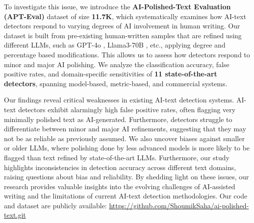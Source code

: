To investigate this issue, we introduce the \textbf{AI-Polished-Text Evaluation (APT-Eval)} dataset of size \textbf{11.7K}, which systematically examines how AI-text detectors respond to varying degrees of AI involvement in human writing. Our dataset is built from pre-existing human-written samples that are refined using different LLMs, such as GPT-4o \citep{openaiGPT4}, Llama3-70B \citep{dubey2024llama}, etc., applying degree and percentage based modifications. This allows us to assess how detectors respond to minor and major AI polishing. We analyze the classification accuracy, false positive rates, and domain-specific sensitivities of \textbf{11 state-of-the-art detectors}, spanning model-based, metric-based, and commercial systems.


Our findings reveal critical weaknesses in existing AI-text detection systems. AI-text detectors exhibit alarmingly high false positive rates, often flagging very minimally polished text as AI-generated. Furthermore, detectors struggle to differentiate between minor and major AI refinements, suggesting that they may not be as reliable as previously assumed. We also uncover biases against smaller or older LLMs, where polishing done by less advanced models is more likely to be flagged than text refined by state-of-the-art LLMs. Furthermore, our study highlights inconsistencies in detection accuracy across different text domains, raising questions about bias and reliability. By shedding light on these issues, our research provides valuable insights into the evolving challenges of AI-assisted writing and the limitations of current AI-text detection methodologies. Our code and dataset are publicly available: \url{https://github.com/ShoumikSaha/ai-polished-text.git}


